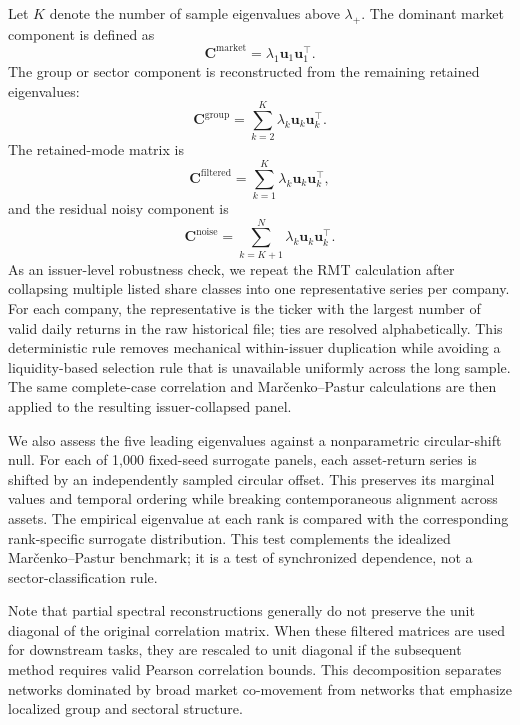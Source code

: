 Let $K$ denote the number of sample eigenvalues above $\lambda_+$. The dominant market component is defined as
\begin{equation}
\mathbf{C}^{\mathrm{market}}
=
\lambda_1
\mathbf{u}_1
\mathbf{u}_1^{\top}.
\end{equation}
The group or sector component is reconstructed from the remaining retained eigenvalues:
\begin{equation}
\mathbf{C}^{\mathrm{group}}
=
\sum_{k=2}^{K}
\lambda_k
\mathbf{u}_k
\mathbf{u}_k^{\top}.
\end{equation}
The retained-mode matrix is
\begin{equation}
\mathbf{C}^{\mathrm{filtered}}
=
\sum_{k=1}^{K}
\lambda_k
\mathbf{u}_k
\mathbf{u}_k^{\top},
\end{equation}
and the residual noisy component is
\begin{equation}
\mathbf{C}^{\mathrm{noise}}
=
\sum_{k=K+1}^{N}
\lambda_k
\mathbf{u}_k
\mathbf{u}_k^{\top}.
\end{equation}
As an issuer-level robustness check, we repeat the RMT calculation after collapsing multiple listed share classes into one representative series per company. For each company, the representative is the ticker with the largest number of valid daily returns in the raw historical file; ties are resolved alphabetically. This deterministic rule removes mechanical within-issuer duplication while avoiding a liquidity-based selection rule that is unavailable uniformly across the long sample. The same complete-case correlation and Mar\v{c}enko--Pastur calculations are then applied to the resulting issuer-collapsed panel.

We also assess the five leading eigenvalues against a nonparametric circular-shift null. For each of 1,000 fixed-seed surrogate panels, each asset-return series is shifted by an independently sampled circular offset. This preserves its marginal values and temporal ordering while breaking contemporaneous alignment across assets. The empirical eigenvalue at each rank is compared with the corresponding rank-specific surrogate distribution. This test complements the idealized Mar\v{c}enko--Pastur benchmark; it is a test of synchronized dependence, not a sector-classification rule.

Note that partial spectral reconstructions generally do not preserve the unit diagonal of the original correlation matrix. When these filtered matrices are used for downstream tasks, they are rescaled to unit diagonal if the subsequent method requires valid Pearson correlation bounds. This decomposition separates networks dominated by broad market co-movement from networks that emphasize localized group and sectoral structure.

